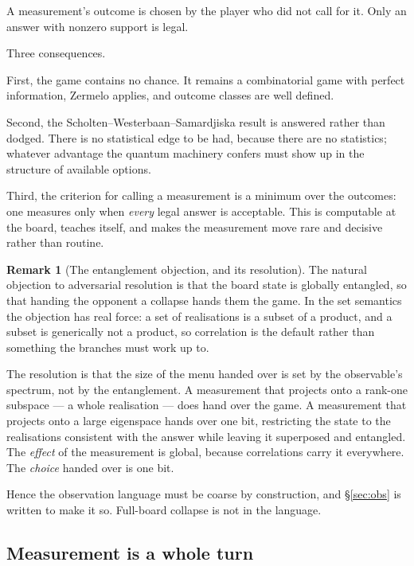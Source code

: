 \documentclass[11pt,a4paper]{article}
\theoremstyle{definition}
\newtheorem{remark}[definition]{Remark}
\theoremstyle{plain}
\begin{document}
A measurement's outcome is chosen by the player who did not call for it. Only
an answer with nonzero support is legal.

Three consequences.

First, the game contains no chance. It remains a combinatorial game with
perfect information, Zermelo applies, and outcome classes are well defined.

Second, the Scholten--Westerbaan--Samardjiska result is answered rather than
dodged. There is no statistical edge to be had, because there are no
statistics; whatever advantage the quantum machinery confers must show up in
the structure of available options.

Third, the criterion for calling a measurement is a minimum over the outcomes:
one measures only when \emph{every} legal answer is acceptable. This is
computable at the board, teaches itself, and makes the measurement move rare
and decisive rather than routine.

\begin{remark}[The entanglement objection, and its resolution]
\label{rem:entanglement}
The natural objection to adversarial resolution is that the board state is
globally entangled, so that handing the opponent a collapse hands them the
game. In the set semantics the objection has real force: a set of realisations
is a subset of a product, and a subset is generically not a product, so
correlation is the default rather than something the branches must work up to.

The resolution is that the size of the menu handed over is set by the
observable's spectrum, not by the entanglement. A measurement that projects
onto a rank-one subspace --- a whole realisation --- does hand over the game.
A measurement that projects onto a large eigenspace hands over one bit,
restricting the state to the realisations consistent with the answer while
leaving it superposed and entangled. The \emph{effect} of the measurement is
global, because correlations carry it everywhere. The \emph{choice} handed over
is one bit.

Hence the observation language must be coarse by construction, and
\S\ref{sec:obs} is written to make it so. Full-board collapse is not in the
language.
\end{remark}

\subsection{Measurement is a whole turn}
\end{document}
